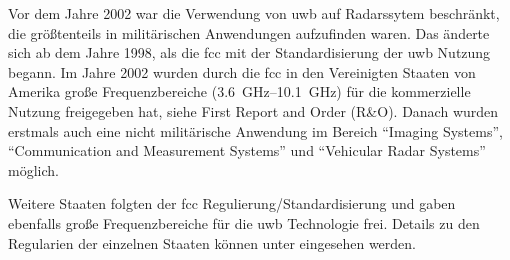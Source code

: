 Vor dem Jahre 2002 war die Verwendung von \gls{uwb} auf Radarssytem beschränkt, die größtenteils in militärischen Anwendungen aufzufinden waren. \cite{yang2004uwbcom} Das änderte sich ab dem Jahre 1998, als die \gls{fcc} mit der Standardisierung der \gls{uwb} Nutzung begann. Im Jahre 2002 wurden durch die \gls{fcc} in den Vereinigten Staaten von Amerika große \mbox{Frequenzbereiche} (\SIrange{3.6}{10.1}{\GHz}) für die kommerzielle Nutzung freigegeben hat, siehe First Report and Order (R\&O). Danach wurden erstmals auch eine nicht militärische Anwendung im Bereich \enquote{Imaging Systems}, \enquote{Communication and Measurement Systems} und \enquote{Vehicular Radar Systems} möglich. \cite{yang2004uwbcom}


Weitere Staaten folgten der \gls{fcc} Regulierung/Standardisierung und gaben ebenfalls große Frequenzbereiche für die \gls{uwb} Technologie frei. Details zu den Regularien der einzelnen Staaten können unter \cite{decawave2015uwbreg} eingesehen werden.

